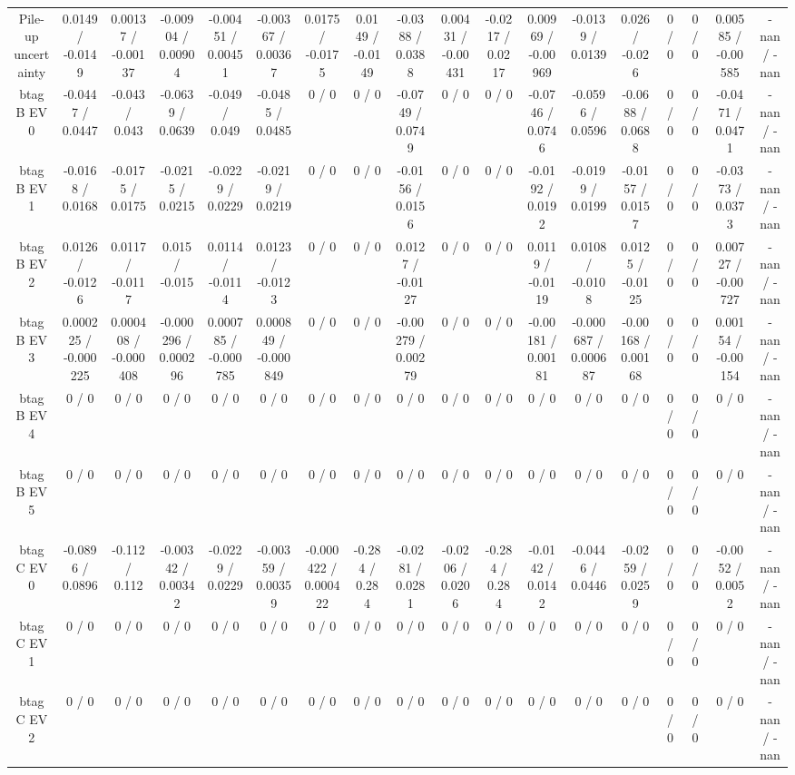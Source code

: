 \documentclass[10pt]{article}
\begin{document}
\begin{table}[htbp]
\begin{center}
\begin{tabular}{|c|c|c|c|c|c|c|c|c|c|c|c|c|c|c|c|c|c|}
  Pile-up uncertainty & 0.0149 / -0.0149 & 0.00137 / -0.00137 & -0.00904 / 0.00904 & -0.00451 / 0.00451 & -0.00367 / 0.00367 & 0.0175 / -0.0175 & 0.0149 / -0.0149 & -0.0388 / 0.0388 & 0.00431 / -0.00431 & -0.0217 / 0.0217 & 0.00969 / -0.00969 & -0.0139 / 0.0139 & 0.026 / -0.026 & 0 / 0 & 0 / 0 & 0.00585 / -0.00585 & -nan / -nan \\ 
  btag B EV 0 & -0.0447 / 0.0447 & -0.043 / 0.043 & -0.0639 / 0.0639 & -0.049 / 0.049 & -0.0485 / 0.0485 & 0 / 0 & 0 / 0 & -0.0749 / 0.0749 & 0 / 0 & 0 / 0 & -0.0746 / 0.0746 & -0.0596 / 0.0596 & -0.0688 / 0.0688 & 0 / 0 & 0 / 0 & -0.0471 / 0.0471 & -nan / -nan \\ 
  btag B EV 1 & -0.0168 / 0.0168 & -0.0175 / 0.0175 & -0.0215 / 0.0215 & -0.0229 / 0.0229 & -0.0219 / 0.0219 & 0 / 0 & 0 / 0 & -0.0156 / 0.0156 & 0 / 0 & 0 / 0 & -0.0192 / 0.0192 & -0.0199 / 0.0199 & -0.0157 / 0.0157 & 0 / 0 & 0 / 0 & -0.0373 / 0.0373 & -nan / -nan \\ 
  btag B EV 2 & 0.0126 / -0.0126 & 0.0117 / -0.0117 & 0.015 / -0.015 & 0.0114 / -0.0114 & 0.0123 / -0.0123 & 0 / 0 & 0 / 0 & 0.0127 / -0.0127 & 0 / 0 & 0 / 0 & 0.0119 / -0.0119 & 0.0108 / -0.0108 & 0.0125 / -0.0125 & 0 / 0 & 0 / 0 & 0.00727 / -0.00727 & -nan / -nan \\ 
  btag B EV 3 & 0.000225 / -0.000225 & 0.000408 / -0.000408 & -0.000296 / 0.000296 & 0.000785 / -0.000785 & 0.000849 / -0.000849 & 0 / 0 & 0 / 0 & -0.00279 / 0.00279 & 0 / 0 & 0 / 0 & -0.00181 / 0.00181 & -0.000687 / 0.000687 & -0.00168 / 0.00168 & 0 / 0 & 0 / 0 & 0.00154 / -0.00154 & -nan / -nan \\ 
  btag B EV 4 & 0 / 0 & 0 / 0 & 0 / 0 & 0 / 0 & 0 / 0 & 0 / 0 & 0 / 0 & 0 / 0 & 0 / 0 & 0 / 0 & 0 / 0 & 0 / 0 & 0 / 0 & 0 / 0 & 0 / 0 & 0 / 0 & -nan / -nan \\ 
  btag B EV 5 & 0 / 0 & 0 / 0 & 0 / 0 & 0 / 0 & 0 / 0 & 0 / 0 & 0 / 0 & 0 / 0 & 0 / 0 & 0 / 0 & 0 / 0 & 0 / 0 & 0 / 0 & 0 / 0 & 0 / 0 & 0 / 0 & -nan / -nan \\ 
  btag C EV 0 & -0.0896 / 0.0896 & -0.112 / 0.112 & -0.00342 / 0.00342 & -0.0229 / 0.0229 & -0.00359 / 0.00359 & -0.000422 / 0.000422 & -0.284 / 0.284 & -0.0281 / 0.0281 & -0.0206 / 0.0206 & -0.284 / 0.284 & -0.0142 / 0.0142 & -0.0446 / 0.0446 & -0.0259 / 0.0259 & 0 / 0 & 0 / 0 & -0.0052 / 0.0052 & -nan / -nan \\ 
  btag C EV 1 & 0 / 0 & 0 / 0 & 0 / 0 & 0 / 0 & 0 / 0 & 0 / 0 & 0 / 0 & 0 / 0 & 0 / 0 & 0 / 0 & 0 / 0 & 0 / 0 & 0 / 0 & 0 / 0 & 0 / 0 & 0 / 0 & -nan / -nan \\ 
  btag C EV 2 & 0 / 0 & 0 / 0 & 0 / 0 & 0 / 0 & 0 / 0 & 0 / 0 & 0 / 0 & 0 / 0 & 0 / 0 & 0 / 0 & 0 / 0 & 0 / 0 & 0 / 0 & 0 / 0 & 0 / 0 & 0 / 0 & -nan / -nan \\ 

\end{tabular}
\end{center}
\end{table}
\end{document}

